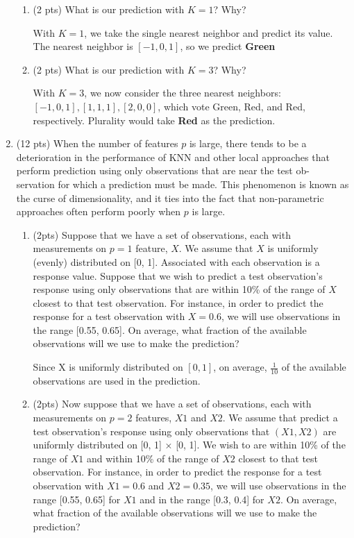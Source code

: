 \documentclass[a4paper]{article}
\theoremstyle{definition}
\newenvironment{soln}{
    \leavevmode\color{blue}\ignorespaces
}{}
\begin{document}
\begin{enumerate}
\begin{enumerate}
	\item (2 pts) What is our prediction with $K=1$? Why?
	
	\begin{soln}  With $K=1$, we take the single nearest neighbor and predict its value. The nearest neighbor is $[-1, 0, 1]$, so we predict \textbf{Green} \end{soln}
	
	\item (2 pts) What is our prediction with $K=3$? Why?
	
	\begin{soln}  With $K=3$, we now consider the three nearest neighbors: $[-1, 0, 1], [1, 1, 1], [2, 0, 0]$, which vote Green, Red, and Red, respectively. Plurality would take \textbf{Red} as the prediction. \end{soln}

\end{enumerate}

\item (12 pts) When the number of features $p$ is large, there tends to be a deterioration in the performance of KNN and other local approaches that perform prediction using only observations that are near the test ob- servation for which a prediction must be made. This phenomenon is known as the curse of dimensionality, and it ties into the fact that non-parametric approaches often perform poorly when $p$ is large.

\begin{enumerate}
	\item (2pts) Suppose that we have a set of observations, each with measurements on $p=1$ feature, $X$. We assume that $X$ is uniformly (evenly) distributed on [0, 1]. Associated with each observation is a response value. Suppose that we wish to predict a test observation’s response using only observations that are within 10\% of the range of $X$ closest to that test observation. For instance, in order to predict the response for a test observation with $X=0.6$, we will use observations in the range [0.55, 0.65]. On average, what fraction of the available observations will we use to make the prediction?
	
	\begin{soln} Since X is uniformly distributed on $[0, 1]$, on average, \textbf{$\frac{1}{10}$} of the available observations are used in the prediction. \end{soln}
	
	
	\item (2pts) Now suppose that we have a set of observations, each with measurements on $p =2$ features, $X1$ and $X2$. We assume that predict a test observation’s response using only observations that $(X1,X2)$ are uniformly distributed on [0, 1] × [0, 1]. We wish to are within 10\% of the range of $X1$ and within 10\% of the range of $X2$ closest to that test observation. For instance, in order to predict the response for a test observation with $X1 =0.6$ and $X2 =0.35$, we will use observations in the range [0.55, 0.65] for $X1$ and in the range [0.3, 0.4] for $X2$. On average, what fraction of the available observations will we use to make the prediction?
	

\end{enumerate}
\end{enumerate}
\end{document}
